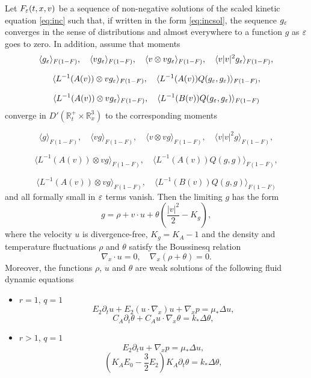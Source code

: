\begin{theorem}\label{th:INSE}
 Let $F_{\varepsilon}(t,x,v)$ be a sequence of non-negative solutions of the scaled
kinetic equation \eqref{eq:inc} such that, if written in the form \eqref{eq:incsol}, the sequence
$g_{\varepsilon}$ converges in the sense of distributions and almost everywhere to
a function $g$ as ${\varepsilon}$ goes to zero. In addition, assume that
moments
\[\langle g_{\varepsilon}\rangle_{F(1-F)},\quad \langle
vg_{\varepsilon}\rangle_{F(1-F)},\quad \langle v\otimes v g_{\varepsilon}\rangle_{F(1-F)},\quad\langle v|v|^2
g_{\varepsilon}\rangle_{F(1-F)},\]

\[\langle L^{-1}(A(v))\otimes vg_{\varepsilon}\rangle_{F(1-F)},\quad \langle
L^{-1}(A(v))Q(g_{\varepsilon},g_{\varepsilon})\rangle_{F(1-F)},\]

\[\langle L^{-1}(A(v))\otimes vg_{\varepsilon}\rangle_{F(1-F)},\quad \langle
L^{-1}(B(v))Q(g_{\varepsilon},g_{\varepsilon})\rangle_{F(1-F)}\]
converge in $D'(\mathbb R^+_t\times\mathbb R^3_x)$ to the corresponding moments

\[\langle g\rangle_{F(1-F)},\quad \langle vg\rangle_{F(1-F)},\quad \langle v\otimes v g\rangle_{F(1-F)},\quad \langle
v|v|^2 g\rangle_{F(1-F)},\]

\[\langle L^{-1}(A(v))\otimes vg\rangle_{F(1-F)},\quad \langle
L^{-1}(A(v))Q(g,g)\rangle_{F(1-F)},\]

\[\langle L^{-1}(A(v))\otimes vg\rangle_{F(1-F)},\quad \langle
L^{-1}(B(v))Q(g,g)\rangle_{F(1-F)}\]
and all formally small in ${\varepsilon}$ terms vanish. Then the limiting $g$ has
the form
\begin{equation}
 g=\rho+v\cdot u +\theta \left(\frac{|v|^2}{2}-K_g\right), \label{eq:incg}
\end{equation}
where the  velocity $u$ is divergence-free, $K_g=K_A -1$ and the density and 
temperature
fluctuations $\rho$ and $\theta$ satisfy the Boussinesq relation
\begin{equation}
 \nabla_x\cdot u =0,\quad \nabla_x(\rho+\theta)=0.\label{eq:incBouss}
\end{equation}
Moreover, the functions $\rho$, $u$ and $\theta$ are weak solutions of the following fluid dynamic
equations

\begin{itemize}
 \item $r=1$, $q=1$
\begin{equation} E_2\partial_t u+ E_{2} (u\cdot \nabla_x) u  
 +\nabla_x p
=\mu_\ast\Delta u,  \label{eq:incU11}\end{equation}
\begin{equation} 
C_A\partial_t \theta + C_A u\cdot \nabla_x\theta= k_\ast\Delta\theta,
 \label{eq:incTH11}\end{equation}
\item $r>1$, $q=1$
\begin{equation}E_2\partial_t   u+\nabla_x p= \mu_\ast\Delta u,\label{eq:incU21}\end{equation}
\begin{equation}
\left( K_AE_0 -\frac{3}{2}  E_2 \right)K_A\partial_t \theta  = k_\ast\Delta\theta, \label{eq:incTH21}\end{equation}


\end{itemize}
\end{theorem}
